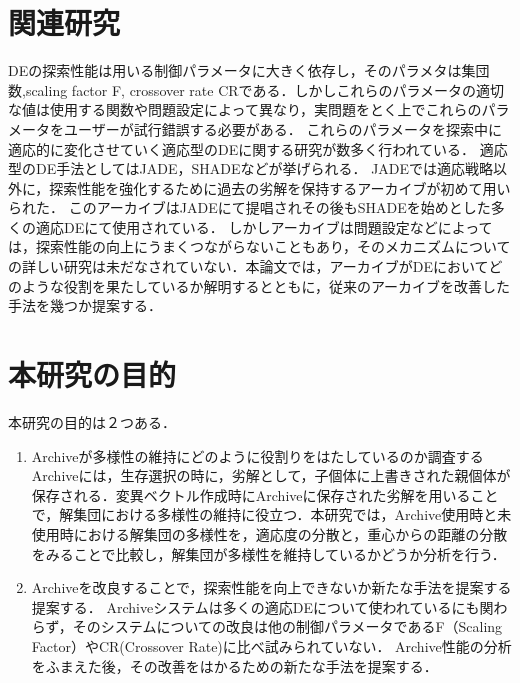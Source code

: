 \documentclass[a4paper,11pt,oneside,openany]{jsbook}
\begin{document}
\section{関連研究}
DEの探索性能は用いる制御パラメータに大きく依存し，そのパラメタは集団数,scaling factor F, crossover rate CRである．しかしこれらのパラメータの適切な値は使用する関数や問題設定によって異なり，実問題をとく上でこれらのパラメータをユーザーが試行錯誤する必要がある．
これらのパラメータを探索中に適応的に変化させていく適応型のDEに関する研究が数多く行われている．
適応型のDE手法としてはJADE\cite{JADE}，SHADE\cite{SHADE}などが挙げられる．
JADEでは適応戦略以外に，探索性能を強化するために過去の劣解を保持するアーカイブが初めて用いられた．
このアーカイブはJADEにて提唱されその後もSHADEを始めとした多くの適応DEにて使用されている．
しかしアーカイブは問題設定などによっては，探索性能の向上にうまくつながらないこともあり，そのメカニズムについての詳しい研究は未だなされていない．本論文では，アーカイブがDEにおいてどのような役割を果たしているか解明するとともに，従来のアーカイブを改善した手法を幾つか提案する．

\section{本研究の目的}
本研究の目的は２つある．
\begin{enumerate}
\item Archiveが多様性の維持にどのように役割りをはたしているのか調査する
\vspace{3mm}
\newline
Archiveには，生存選択の時に，劣解として，子個体に上書きされた親個体が保存される．変異ベクトル作成時にArchiveに保存された劣解を用いることで，解集団における多様性の維持に役立つ．本研究では，Archive使用時と未使用時における解集団の多様性を，適応度の分散と，重心からの距離の分散をみることで比較し，解集団が多様性を維持しているかどうか分析を行う．
\newline


\item Archiveを改良することで，探索性能を向上できないか新たな手法を提案する提案する．
\vspace{3mm}
\newline
Archiveシステムは多くの適応DEについて使われているにも関わらず，そのシステムについての改良は他の制御パラメータであるF（Scaling Factor）やCR(Crossover Rate)に比べ試みられていない．
Archive性能の分析をふまえた後，その改善をはかるための新たな手法を提案する．
\end{enumerate}
\end{document}
